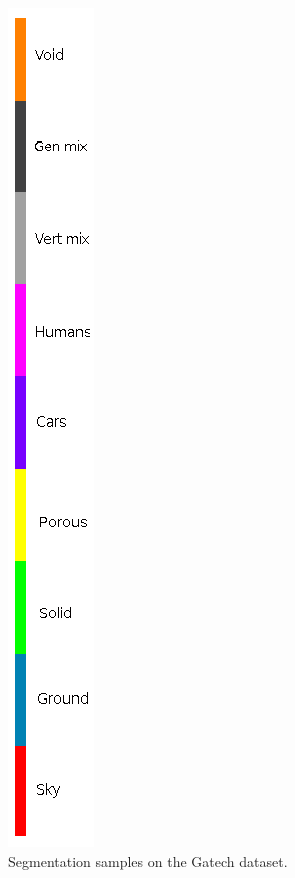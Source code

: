 \begin{figure}[p]
\begin{minipage}[c]{.1\textwidth}
        \includegraphics[width=.7\textwidth]{img/deconvLSTM/gatech_barra.png}
    \end{minipage}%
    \caption{Segmentation samples on the Gatech dataset.}
	\label{fig:deconvlstm_gatech_samples}
\end{figure}


